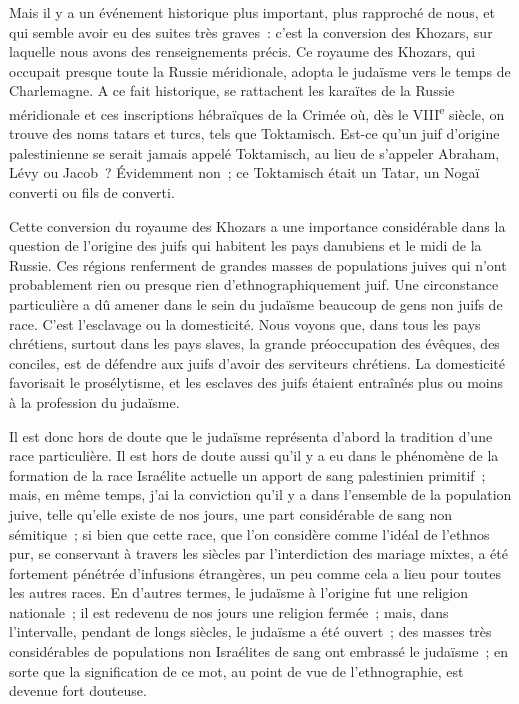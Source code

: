 \documentclass[french,twoside]{book} %
\newcommand\orgName[1]{#1}
\newcommand\persName[1]{#1}
\newcommand\placeName[1]{#1}
\begin{document}
Mais il y a un événement historique plus important, plus rapproché de nous, et qui semble avoir eu des suites très graves : c’est la conversion des {\orgName Khozars}, sur laquelle nous avons des renseignements précis. Ce royaume des {\orgName Khozars}, qui occupait presque toute la {\placeName Russie méridionale}, adopta le judaïsme vers le temps de {\persName Charlemagne}. A ce fait historique, se rattachent les {\orgName karaïtes} de la {\placeName Russie méridionale} et ces inscriptions hébraïques de la {\placeName Crimée} où, dès le VIII\textsuperscript{e} siècle, on trouve des noms tatars et turcs, tels que Toktamisch. Est-ce qu’un juif d’origine palestinienne se serait jamais appelé Toktamisch, au lieu de s’appeler Abraham, Lévy ou Jacob ? Évidemment non ; ce Toktamisch était un Tatar, un Nogaï converti ou fils de converti.\par
Cette conversion du royaume des {\orgName Khozars} a une importance considérable dans la question de l’origine des juifs qui habitent les pays danubiens et le midi de la {\placeName Russie}. Ces régions renferment de grandes masses de populations juives qui n’ont probablement rien ou presque rien d’ethnographiquement juif. Une circonstance particulière a dû amener dans le sein du judaïsme beaucoup de gens non juifs de race. C’est l’esclavage ou la domesticité. Nous voyons que, dans tous les pays chrétiens, surtout dans les pays slaves, la grande préoccupation des évêques, des conciles, est de défendre aux juifs d’avoir des serviteurs chrétiens. La domesticité favorisait le prosélytisme, et les esclaves des juifs étaient entraînés plus ou moins à la profession du judaïsme.\par
Il est donc hors de doute que le judaïsme représenta d’abord la tradition d’une race particulière. Il est hors de doute aussi qu’il y a eu dans le phénomène de la formation de la race Israélite actuelle un apport de sang palestinien primitif ; mais, en même temps, j’ai la conviction qu’il y a dans l’ensemble de la population juive, telle qu’elle existe de nos jours, une part considérable de sang non sémitique ; si bien que cette race, que l’on considère comme l’idéal de l’ethnos pur, se conservant à travers les siècles par l’interdiction des mariage mixtes, a été fortement pénétrée d’infusions étrangères, un peu comme cela a lieu pour toutes les autres races. En d’autres termes, le judaïsme à l’origine fut une religion nationale ; il est redevenu de nos jours une religion fermée ; mais, dans l’intervalle, pendant de longs siècles, le judaïsme a été ouvert ; des masses très considérables de populations non Israélites de sang ont embrassé le judaïsme ; en sorte que la signification de ce mot, au point de vue de l’ethnographie, est devenue fort douteuse.\par
\end{document}
